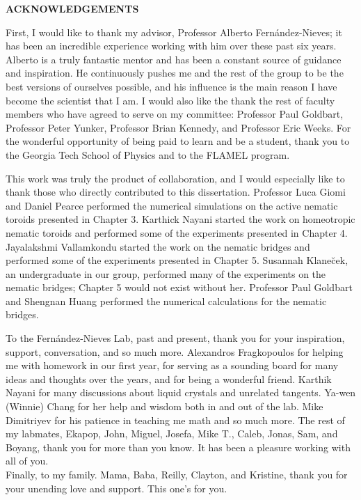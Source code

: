 \clearpage
\begin{centering}
\textbf{ACKNOWLEDGEMENTS}\\
\vspace{\baselineskip}
\end{centering}

First, I would like to thank my advisor, Professor Alberto Fern\'andez-Nieves; it has been an incredible experience working with him over these past six years.
Alberto is a truly fantastic mentor and has been a constant source of guidance and inspiration.
He continuously pushes me and the rest of the group to be the best versions of ourselves possible, and his influence is the main reason I have become the scientist that I am.
I would also like the thank the rest of faculty members who have agreed to serve on my committee: Professor Paul Goldbart, Professor Peter Yunker, Professor Brian Kennedy, and Professor Eric Weeks.
For the wonderful opportunity of being paid to learn and be a student, thank you to the Georgia Tech School of Physics and to the FLAMEL program.

This work was truly the product of collaboration, and I would especially like to thank those who directly contributed to this dissertation.
Professor Luca Giomi and Daniel Pearce performed the numerical simulations on the active nematic toroids presented in Chapter 3.
Karthick Nayani started the work on homeotropic nematic toroids and performed some of the experiments presented in Chapter 4.
Jayalakshmi Vallamkondu started the work on the nematic bridges and performed some of the experiments presented in Chapter 5.
Susannah Klane\u{c}ek, an undergraduate in our group, performed many of the experiments on the nematic bridges; Chapter 5 would not exist without her.
Professor Paul Goldbart and Shengnan Huang performed the numerical calculations for the nematic bridges.

To the Fern\'andez-Nieves Lab, past and present, thank you for your inspiration, support, conversation, and so much more.
Alexandros Fragkopoulos for helping me with homework in our first year, for serving as a sounding board for many ideas and thoughts over the years, and for being a wonderful friend.
Karthik Nayani for many discussions about liquid crystals and unrelated tangents.
Ya-wen (Winnie) Chang for her help and wisdom both in and out of the lab.
Mike Dimitriyev for his patience in teaching me math and so much more.
The rest of my labmates, Ekapop, John, Miguel, Josefa, Mike T., Caleb, Jonas, Sam, and Boyang, thank you for more than you know.
It has been a pleasure working with all of you. \\

\noindent Finally, to my family.
Mama, Baba, Reilly, Clayton, and Kristine, thank you for your unending love and support.
This one's for you.

\clearpage

